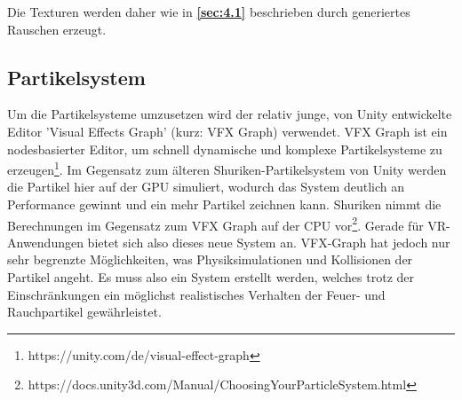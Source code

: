 Die Texturen werden daher wie in \textbf{\autoref{sec:4.1}} beschrieben durch generiertes Rauschen erzeugt.  



\subsection{Partikelsystem}
Um die Partikelsysteme umzusetzen wird der relativ junge, von Unity entwickelte Editor 'Visual Effects Graph' 
(kurz: VFX Graph) verwendet. VFX Graph ist ein nodesbasierter Editor, um schnell
dynamische und komplexe Partikelsysteme zu erzeugen\footnote{https://unity.com/de/visual-effect-graph}.
Im Gegensatz zum älteren Shuriken-Partikelsystem von Unity werden die Partikel hier auf der GPU
simuliert, wodurch das System deutlich an Performance gewinnt und ein mehr Partikel zeichnen kann. 
Shuriken nimmt die Berechnungen im Gegensatz zum VFX Graph auf der CPU vor\footnote{https://docs.unity3d.com/Manual/ChoosingYourParticleSystem.html}. 
Gerade für VR-Anwendungen bietet sich also dieses neue System an.
VFX-Graph hat jedoch nur sehr begrenzte Möglichkeiten, was Physiksimulationen und Kollisionen der Partikel angeht. 
Es muss also ein System erstellt werden, welches trotz der Einschränkungen ein möglichst realistisches 
Verhalten der Feuer- und Rauchpartikel gewährleistet.  




\newpage
